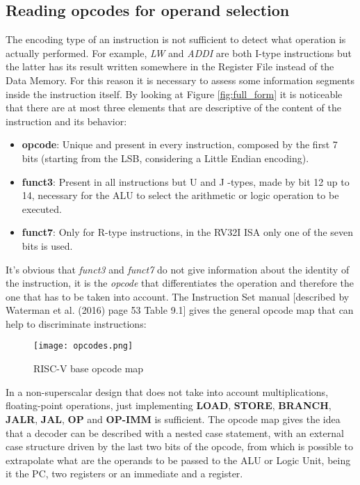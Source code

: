 \subsection{Reading opcodes for operand selection}
The encoding type of an instruction is not sufficient to detect what operation is actually performed. For example, \emph{LW} and \emph{ADDI} are both I-type instructions but the latter has its result written somewhere in the Register File instead of the Data Memory.
For this reason it is necessary to assess some information segments inside the instruction itself. By looking at Figure \ref{fig:full_form} it is noticeable that there are at most three elements that are descriptive of the content of the instruction and its behavior:
\begin{itemize}
  \item \textbf{opcode}: Unique and present in every instruction, composed by the first 7 bits (starting from the LSB, considering a Little Endian encoding).
  \item \textbf{funct3}: Present in all instructions but U and J -types, made by bit 12 up to 14, necessary for the ALU to select the arithmetic or logic operation to be executed.
  \item \textbf{funct7}: Only for R-type instructions, in the RV32I ISA only one of the seven bits is used.
\end{itemize}
It's obvious that \emph{funct3} and \emph{funct7} do not give information about the identity of the instruction, it is the \emph{opcode} that differentiates the operation and therefore the one that has to be taken into account. The Instruction Set manual [described by Waterman et al. (2016) \cite{waterman2016riscv} page 53 Table 9.1] gives the general opcode map that can help to discriminate instructions: 

\begin{figure}[h!]
  \centering
  \texttt{[image: opcodes.png]}
  \caption{RISC-V base opcode map \cite{waterman2016riscv}} 
\end{figure}
In a non-superscalar design that does not take into account multiplications, floating-point operations, just implementing \textbf{LOAD}, \textbf{STORE}, \textbf{BRANCH}, \textbf{JALR}, \textbf{JAL}, \textbf{OP} and \textbf{OP-IMM} is sufficient.
The opcode map gives the idea that a decoder can be described with a nested case statement, with an external case structure driven by the last two bits of the opcode, from which is possible to extrapolate what are the operands to be passed to the ALU or Logic Unit, being it the PC, two registers or an immediate and a register.  

